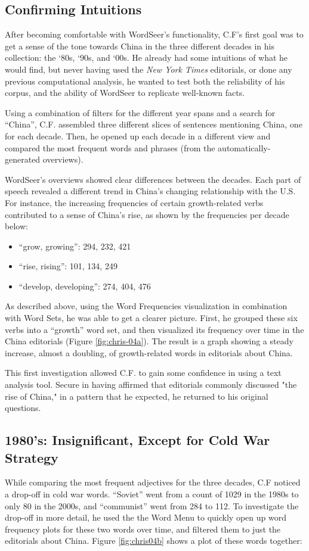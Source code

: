 \documentclass{sig-alternate}
\begin{document}
\begin{enumerate}
\subsection{Confirming Intuitions}
After becoming comfortable with WordSeer's functionality, C.F's first goal was to get a sense of the tone towards China in the three different decades in his collection: the `80s, `90s, and `00s.  He already had some intuitions of what he would find, but never having used the \emph{New York Times} editorials, or done any previous computational analysis, he wanted to test both the reliability of his corpus, and the ability of WordSeer to replicate well-known facts.

Using a combination of filters for the different year spans and a search for ``China'', C.F. assembled three different slices of sentences mentioning China, one for each decade. Then, he opened up each decade in a different view and compared the most frequent words and phrases (from the automatically-generated overviews).

WordSeer's overviews showed clear differences between the decades. Each part of speech revealed a different trend in China's changing relationship with the U.S. 
For instance, the increasing  frequencies of certain growth-related verbs contributed to a sense of China's rise, as shown by the frequencies per decade below:
\begin{itemize}
\item ``grow, growing'':  294, 232, 421
\item ``rise, rising'': 101, 134, 249
\item ``develop, developing'': 274, 404, 476
\end{itemize}
As described above, using the Word Frequencies visualization in combination with Word Sets, he was able to get a clearer picture. First, he grouped these six verbs into a ``growth'' word set, and then visualized its frequency over time in the China editorials (Figure \ref{fig:chris-04a}).  The result is a graph showing a steady increase, almost a doubling, of growth-related words in editorials about China.

This first investigation allowed C.F. to gain some confidence in using a text analysis tool. Secure in having affirmed that editorials commonly discussed "the rise of China," in a pattern that he expected, he returned to his original questions.

\subsection{1980's: Insignificant, Except for Cold War Strategy}
While comparing the most frequent adjectives for the three decades, C.F noticed a drop-off in cold war words. ``Soviet''  went from  a count of 1029 in the 1980s to only 80 in the 2000s, and ``communist'' went from 284 to 112.   To investigate the drop-off in more detail, he used the the Word Menu to quickly open up word frequency plots for these two words over time, and filtered them to just the editorials about China.  Figure \ref{fig:chris04b} shows a plot of these words together:


\end{enumerate}
\end{document}
